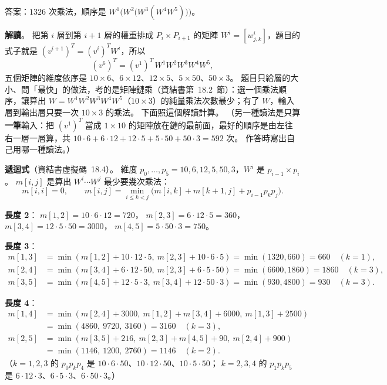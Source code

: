 \begin{pastsoln}
答案：$1326$ 次乘法，順序是 $W^1\bigl(W^2\bigl(W^3(W^4 W^5)\bigr)\bigr)$。

\textbf{解讀}。 把第 $i$ 層到第 $i + 1$ 層的權重排成 $P_i \times P_{i+1}$ 的矩陣
$W^i = [w^i_{j,k}]$，題目的式子就是 $(v^{i+1})^T = (v^i)^T W^i$，所以
\[
(v^6)^T = (v^1)^T\, W^1 W^2 W^3 W^4 W^5 ,
\]
五個矩陣的維度依序是 $10 \times 6$、$6 \times 12$、$12 \times 5$、$5 \times 50$、$50 \times 3$。
題目只給層的大小、問「最快」的做法，考的是矩陣鏈乘（資結書第~18.2~節）：選一個乘法順序，讓算出
$W = W^1 W^2 W^3 W^4 W^5$（$10 \times 3$）的純量乘法次數最少；有了 $W$，輸入層到輸出層只要一次
$10 \times 3$ 的乘法。 下面照這個解讀計算。 （另一種讀法是只算\textbf{一筆}輸入：把 $(v^1)^T$ 當成
$1 \times 10$ 的矩陣放在鏈的最前面，最好的順序是由左往右一層一層算，共
$10 \cdot 6 + 6 \cdot 12 + 12 \cdot 5 + 5 \cdot 50 + 50 \cdot 3 = 592$ 次。 作答時寫出自己用哪一種讀法。）

\textbf{遞迴式}（資結書虛擬碼~18.4）。 維度 $p_0, \ldots, p_5 = 10, 6, 12, 5, 50, 3$，$W^i$ 是
$p_{i-1} \times p_i$。 $m[i, j]$ 是算出 $W^i \cdots W^j$ 最少要幾次乘法：
\[
m[i, i] = 0, \qquad
m[i, j] = \min_{i \le k < j} \bigl( m[i, k] + m[k + 1, j] + p_{i-1} p_k p_j \bigr).
\]

\textbf{長度 2}：
$m[1,2] = 10 \cdot 6 \cdot 12 = 720$，
$m[2,3] = 6 \cdot 12 \cdot 5 = 360$，
$m[3,4] = 12 \cdot 5 \cdot 50 = 3000$，
$m[4,5] = 5 \cdot 50 \cdot 3 = 750$。

\textbf{長度 3}：
\begin{align*}
m[1,3] &= \min(m[1,2] + 10 \cdot 12 \cdot 5,\ m[2,3] + 10 \cdot 6 \cdot 5) = \min(1320, 660) = 660
  \quad (k = 1), \\
m[2,4] &= \min(m[3,4] + 6 \cdot 12 \cdot 50,\ m[2,3] + 6 \cdot 5 \cdot 50) = \min(6600, 1860) = 1860
  \quad (k = 3), \\
m[3,5] &= \min(m[4,5] + 12 \cdot 5 \cdot 3,\ m[3,4] + 12 \cdot 50 \cdot 3) = \min(930, 4800) = 930
  \quad (k = 3).
\end{align*}

\textbf{長度 4}：
\begin{align*}
m[1,4] &= \min(m[2,4] + 3000,\ m[1,2] + m[3,4] + 6000,\ m[1,3] + 2500) \\
  &= \min(4860,\ 9720,\ 3160) = 3160 \quad (k = 3), \\
m[2,5] &= \min(m[3,5] + 216,\ m[2,3] + m[4,5] + 90,\ m[2,4] + 900) \\
  &= \min(1146,\ 1200,\ 2760) = 1146 \quad (k = 2).
\end{align*}
（$k = 1, 2, 3$ 的 $p_0 p_k p_4$ 是 $10 \cdot 6 \cdot 50$、$10 \cdot 12 \cdot 50$、$10 \cdot 5 \cdot 50$；
$k = 2, 3, 4$ 的 $p_1 p_k p_5$ 是 $6 \cdot 12 \cdot 3$、$6 \cdot 5 \cdot 3$、$6 \cdot 50 \cdot 3$。）


\end{pastsoln}
